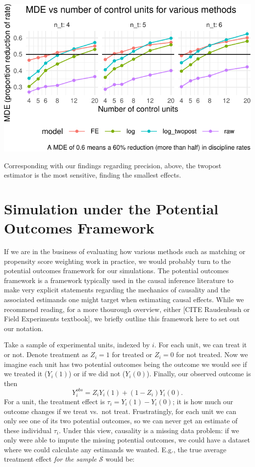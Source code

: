 \documentclass[
]{book}
\begin{document}
\begin{center}\includegraphics[width=0.75\linewidth]{Designing-Simulations-in-R_files/figure-latex/disc_mde-1} \end{center}

Corresponding with our findings regarding precision, above, the twopost estimator is the most sensitive, finding the smallest effects.

\chapter{Simulation under the Potential Outcomes Framework}\label{potential-outcomes}

If we are in the business of evaluating how various methods such as matching or propensity score weighting work in practice, we would probably turn to the potential outcomes framework for our simulations.
The potential outcomes framework is a framework typically used in the causal inference literature to make very explicit statements regarding the mechanics of causality and the associated estimands one might target when estimating causal effects.
While we recommend reading, for a more thourough overview, either {[}CITE Raudenbush or Field Experiments textbook{]}, we briefly outline this framework here to set out our notation.

Take a sample of experimental units, indexed by \(i\).
For each unit, we can treat it or not.
Denote treatment as \(Z_i = 1\) for treated or \(Z_i = 0\) for not treated.
Now we imagine each unit has two potential outcomes being the outcome we would see if we treated it (\(Y_i(1)\)) or if we did not (\(Y_i(0)\)).
Finally, our observed outcome is then
\[ Y_i^{obs} = Z_i Y_i(1) + (1-Z_i)Y_i(0) .\]
For a unit, the treatment effect is \(\tau_i = Y_i(1) - Y_i(0)\); it is how much our outcome changes if we treat vs.~not treat.
Frustratingly, for each unit we can only see one of its two potential outcomes, so we can never get an estimate of these individual \(\tau_i\).
Under this view, causality is a missing data problem: if we only were able to impute the missing potential outcomes, we could have a dataset where we could calculate any estimands we wanted. E.g., the true average treatment effect \emph{for the sample} \(\mathcal{S}\) would be:
\end{document}
